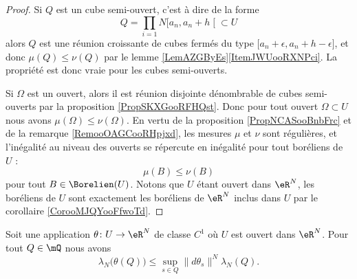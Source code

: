 \begin{proof}
    Si \( Q\) est un cube semi-ouvert, c'est à dire de la forme
    \begin{equation}
        Q=\prod_{i=1}N\mathopen[ a_n , a_n+h \mathclose[\subset U
    \end{equation}
    alors \( Q\) est une réunion croissante de cubes fermés du type \( \mathopen[ a_n+\epsilon , a_n+h-\epsilon \mathclose]\), et donc \( \mu(Q)\leq \nu(Q)\) par le lemme \ref{LemAZGByEs}\ref{ItemJWUooRXNPci}. La propriété est donc vraie pour les cubes semi-ouverts.

    Si \( \Omega\) est un ouvert, alors il est réunion disjointe dénombrable de cubes semi-ouverts par la proposition \ref{PropSKXGooRFHQst}. Donc pour tout ouvert \( \Omega\subset U\) nous avons \( \mu(\Omega)\leq\nu(\Omega)\). En vertu de la proposition \ref{PropNCASooBnbFrc} et de la remarque \ref{RemooOAGCooRHpjxd}, les mesures \( \mu\) et \( \nu\) sont régulières, et l'inégalité au niveau des ouverts se répercute en inégalité pour tout boréliens de \( U\) :
    \begin{equation}
        \mu(B)\leq \nu(B)
    \end{equation}
    pour tout \( B\in\Borelien(U)\). Notons que \( U\) étant ouvert dans \( \eR^N\), les boréliens de \( U\) sont exactement les boréliens de \( \eR^N\) inclus dans \( U\) par le corollaire \ref{CorooMJQYooFfwoTd}.
\end{proof}

\begin{lemma}      \label{LemooJCEDooBRyjRg}
    Soit une application \( \theta\colon U\to \eR^N\) de classe \( C^1\) où \( U\) est ouvert dans \( \eR^N\). Pour tout \( Q\in\mQ\) nous avons
    \begin{equation}
        \lambda_N\big( \theta(Q) \big)\leq\sup_{s\in Q}\| d\theta_s \|^N\lambda_N(Q).
    \end{equation}
\end{lemma}

